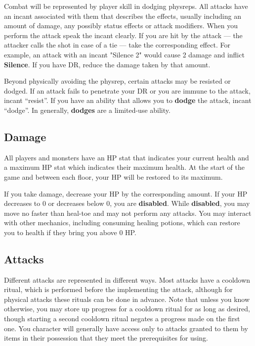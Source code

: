 \documentclass[green]{grimrock}
\begin{document}
Combat will be represented by player skill in dodging physreps.  All attacks have an incant associated with them that describes the effects, usually including an amount of damage, any possibly status effects or attack modifiers.  When you perform the attack speak the incant clearly.  If you are hit by the attack --- the attacker calls the shot in case of a tie --- take the corresponding effect.  For example, an attack with an incant "Silence 2" would cause 2 damage and inflict {\bf Silence}.  If you have DR, reduce the damage taken by that amount.

Beyond physically avoiding the physrep, certain attacks may be resisted or dodged.  If an attack fails to penetrate your DR or you are immune to the attack, incant ``resist''.  If you have an ability that allows you to {\bf dodge} the attack, incant ``dodge''.  In generally, {\bf dodges} are a limited-use ability.

\subsection{Damage}  All players and monsters have an HP stat that indicates your current health and a maximum HP stat which indicates their maximum health.  At the start of the game and between each floor, your HP will be restored to its maximum.

If you take damage, decrease your HP by the corresponding amount.  If your HP decreases to 0 or decreases below 0, you are {\bf disabled}.  While {\bf disabled}, you may move no faster than heal-toe and may not perform any attacks.  You may interact with other mechanics, including consuming healing potions, which can restore you to health if they bring you above 0 HP.

\subsection{Attacks}

Different attacks are represented in different ways.  Most attacks have a cooldown ritual, which is performed before the implementing the attack, although for physical attacks these rituals can be done in advance. Note that unless you know otherwise, you may store up progress for a cooldown ritual for as long as desired, though starting a second cooldown ritual negates a progress made on the first one. You character will generally have access only to attacks granted to them by items in their possession that they meet the prerequisites for using.
\end{document}
